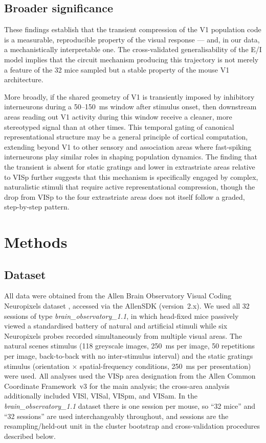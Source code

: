\documentclass[11pt,onecolumn]{article}
\begin{document}
\subsection{Broader significance}

These findings establish that the transient compression of the V1
population code is a measurable, reproducible property of the visual
response --- and, in our data, a mechanistically interpretable one.  The
cross-validated generalisability of the E/I model implies that the circuit
mechanism producing this trajectory is not merely a feature of the 32 mice
sampled but a stable property of the mouse V1 architecture.

More broadly, if the shared geometry of V1 is transiently imposed by
inhibitory interneurons during a 50--150~ms window after stimulus onset,
then downstream areas reading out V1 activity during this window receive
a cleaner, more stereotyped signal than at other times.  This temporal
gating of canonical representational structure may be a general principle
of cortical computation, extending beyond V1 to other sensory and
association areas where fast-spiking interneurons play similar roles in
shaping population dynamics.  The finding that the transient is absent for
static gratings and lower in extrastriate areas relative to VISp further
suggests that this mechanism is specifically engaged by complex,
naturalistic stimuli that require active representational compression,
though the drop from VISp to the four extrastriate areas does not itself
follow a graded, step-by-step pattern.

\section{Methods}

\subsection{Dataset}

All data were obtained from the Allen Brain Observatory Visual Coding
Neuropixels dataset \citep{siegle2021}, accessed via the AllenSDK
(version~2.x).  We used all 32 sessions of type
\textit{brain\_observatory\_1.1}, in which head-fixed mice passively
viewed a standardised battery of natural and artificial stimuli while six
Neuropixels probes recorded simultaneously from multiple visual areas.
The natural scenes stimulus (118 greyscale images, 250~ms per image, 50
repetitions per image, back-to-back with no inter-stimulus interval) and
the static gratings stimulus (orientation $\times$ spatial-frequency
conditions, 250~ms per presentation) were used.  All analyses used the
VISp area designation from the Allen Common Coordinate Framework~v3 for
the main analysis; the cross-area analysis additionally included VISl,
VISal, VISpm, and VISam.  In the \textit{brain\_observatory\_1.1} dataset
there is one session per mouse, so ``32 mice'' and ``32 sessions'' are
used interchangeably throughout, and sessions are the resampling/held-out
unit in the cluster bootstrap and cross-validation procedures described
below.
\end{document}
